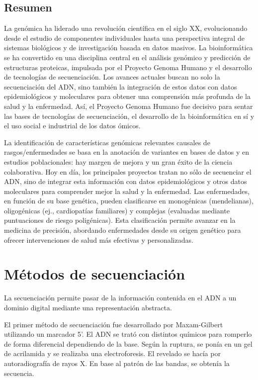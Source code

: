 \subsection{Resumen}
La genómica ha liderado una revolución científica en el siglo XX, evolucionando desde el estudio de componentes individuales hasta una perspectiva integral de sistemas biológicos y de investigación basada en datos masivos. La bioinformática se ha convertido en una disciplina central en el análisis genómico y predicción de estructuras proteicas, impulsada por el Proyecto Genoma Humano y el desarrollo de tecnologías de secuenciación. Los avances actuales buscan no solo la secuenciación del ADN, sino también la integración de estos datos con datos epidemiológicos y moleculares para obtener una comprensión más profunda de la salud y la enfermedad. Así, el Proyecto Genoma Humano fue decisivo para sentar las bases de tecnologías de secuenciación, el desarrollo de la bioinformática en sí y el uso social e industrial de los datos ómicos.

La identificación de características genómicas relevantes causales de rasgos/enfermedades se basa en la anotación de variantes en bases de datos y en estudios poblacionales: hay margen de mejora y un gran éxito de la ciencia colaborativa. Hoy en día, los principales proyectos tratan no sólo de secuenciar el ADN, sino de integrar esta información con datos epidemiológicos y otros datos moleculares para comprender mejor la salud y la enfermedad.
Las enfermedades, en función de su base genética, pueden clasificarse en monogénicas (mendelianas), oligogénicas (ej., cardiopatías familiares) y complejas (evaluadas mediante puntuaciones de riesgo poligénicas). Esta clasificación permite avanzar en la medicina de precisión, abordando enfermedades desde su origen genético para ofrecer intervenciones de salud más efectivas y personalizadas.

\section{Métodos de secuenciación}
La secuenciación permite pasar de la información contenida en el ADN a un dominio digital mediante una representación abstracta. 

El primer método de secuenciación fue desarrollado por Maxam-Gilbert utilizando un marcador 5'. El ADN se trató con distintos químicos para romperlo de forma diferencial dependiendo de la base. Según la ruptura, se ponía en un gel de acrilamida y se realizaba una electroforesis. El revelado se hacía por autoradiografía de rayos X. En base al patrón de las bandas, se obtenía la secuencia. 


